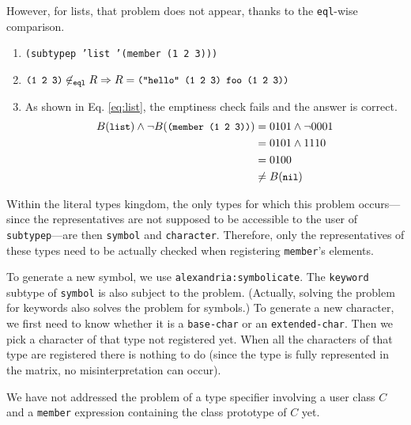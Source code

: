 \documentclass[format=sigconf]{acmart}
\newcommand\code[2][\small]{\sloppy\texttt{#1#2}}
\newcommand\mcode[2][\small]{\text{\code[#1]{#2}}}
\theoremstyle{definition}
\begin{document}
However, for lists, that problem does not appear, thanks to the \code{eql}-wise
comparison.
\begin{enumerate}
\item \code{(subtypep 'list '(member (1 2 3)))}
\item $\mcode{(1 2 3)} \not\in_{\mcode[\scriptsize]{eql}} R \Rightarrow R =
  \mcode{("hello" (1 2 3) foo (1 2 3))}$
\item As shown in Eq. \ref{eq:list}, the emptiness check fails and the answer is
  correct.
  \begin{align}
    B(\mcode{list}) \wedge \neg B(\mcode{(member (1 2 3))}) &= 0101 \wedge \neg 0001 \label{eq:list}\\
                                                            &= 0101 \wedge 1110 \nonumber\\
                                                            &= 0100 \nonumber\\
                                                            &\not= B(\mcode{nil}) \nonumber
  \end{align}
\end{enumerate}

Within the literal types kingdom, the only types for which this problem
occurs---since the representatives are not supposed to be accessible to the user
of \code{subtypep}---are then \code{symbol} and \code{character}.
Therefore, only the representatives of these types need to be actually checked
when registering \code{member}'s elements.

To generate a new symbol, we use \code{alexandria:symbolicate}.
The \code{keyword} subtype of \code{symbol} is also subject to the problem.
(Actually, solving the problem for keywords also solves the problem for
symbols.)
To generate a new character, we first need to know whether it is a
\code{base-char} or an \code{extended-char}. Then we pick a character of that
type not registered yet. When all the characters of that type are registered
there is nothing to do (since the type is fully represented in the matrix, no
misinterpretation can occur).

We have not addressed the problem of a type
specifier involving a user class $C$ and a \code{member} expression containing
the class prototype of $C$ yet.
\end{document}
